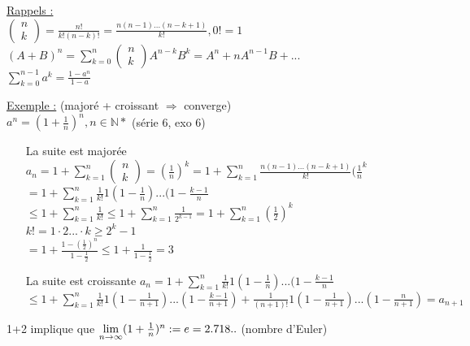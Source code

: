 \documentclass[12pt,a4paper]{article}
\begin{document}
{\begin{boite}
\underline{Rappels :}\\
$\begin{pmatrix}
n \\ 
k
\end{pmatrix}
= \frac{n!}{k!(n-k)!} = \frac{n(n-1)...(n-k+1)}{k!}, 0! = 1$\\
$(A+B)^n = \sum^{n}_{k=0} \begin{pmatrix}
n \\ 
k
\end{pmatrix}
A^{n-k}B^k = A^n + nA^{n-1}B+...$\\
$\sum^{n-1}_{k=0}a^k = \frac{1-a^n}{1-a}$
\end{boite}
\underline{Exemple :} (majoré + croissant $\Rightarrow$ converge)\\
$a^n = (1 + \frac{1}{n})^n, n \in \mathbb{N*}$ (série 6, exo 6)\\
\begin{enumerate}
\item[La suite est majorée] $a_n = 1 + \sum_{k=1}^{n} \begin{pmatrix}
n\\
k
\end{pmatrix}
=(\frac{1}{n})^k = 1 + \sum_{k=1}^n \frac{n(n-1)...(n-k+1)}{k!}(\frac{1}{n}^k$\\
$=1 + \sum_{k=1}^n\frac{1}{k!} 1(1-\frac{1}{n})...(1- \frac{k-1}{n}$\\
$\leq 1 + \sum_{k=1}^n \frac{1}{k!} \leq 1 + \sum_{k=1}^n \frac{1}{2^{ k-1}} = 1 + \sum_{k=1}^n (\frac{1}{2})^k$\\
$k! = 1\cdot 2...\cdot k \geq 2^k-1$\\
$=1 +  \frac{1-(\frac{1}{2})^n}{1 - \frac{1}{2}} \leq 1 + \frac{1}{1- \frac{1}{2}} = 3$
\item[La suite est croissante] $a_n = 1 + \sum_{k=1}^n \frac{1}{k!} 1 (1-\frac{1}{n})...(1-\frac{k-1}{n}$\\
$\leq 1 + \sum_{k=1}^n \frac{1}{k!} 1(1-\frac{1}{n+1})...(1-\frac{k-1}{n+1}) + \frac{1}{(n+1)!}1(1-\frac{1}{n+1})...(1-\frac{n}{n+1}) = a_{n+1}$
\end{enumerate}
1+2  implique que $\lim\limits_{n \to \infty} (1+\frac{1}{n})^n := e = 2.718..$ (nombre d'Euler)
}
\end{document}
